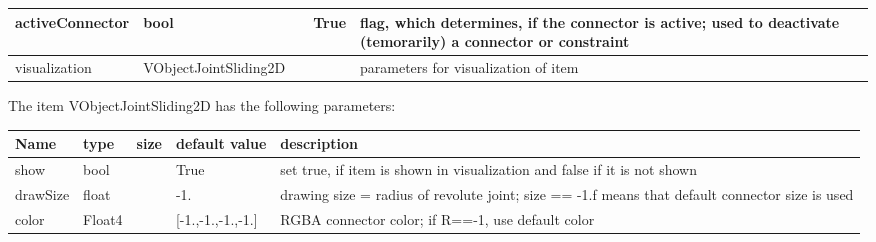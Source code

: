 \begin{center}
\begin{longtable}{| p{4.5cm} | p{2.5cm} | p{0.5cm} | p{2.5cm} | p{6cm} |}
    activeConnector &     bool &      &     True &     flag, which determines, if the connector is active; used to deactivate (temorarily) a connector or constraint\\ \hline
    visualization & VObjectJointSliding2D & & & parameters for visualization of item \\ \hline
	  \end{longtable}
	\end{center}
The item VObjectJointSliding2D has the following parameters:\vspace{-1cm}\\ 
\begin{center}
  \footnotesize
  \begin{longtable}{| p{4.5cm} | p{2.5cm} | p{0.5cm} | p{2.5cm} | p{6cm} |}
    \hline
    \bf Name & \bf type & \bf size & \bf default value & \bf description \\ \hline
    show &     bool &      &     True &     set true, if item is shown in visualization and false if it is not shown\\ \hline
    drawSize &     float &      &     -1. &     drawing size = radius of revolute joint; size == -1.f means that default connector size is used\\ \hline
    color &     Float4 &      &     [-1.,-1.,-1.,-1.] &     RGBA connector color; if R==-1, use default color\\ \hline
	  \end{longtable}
	\end{center}

